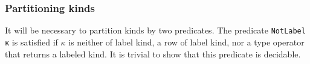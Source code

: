 \documentclass[authoryear, acmsmall, screen, review, nonacm]{acmart}
\begin{document}
\begin{code}%
\>[0]\AgdaSpace{}%
\AgdaSpace{}%
\AgdaSymbol{:}\AgdaSpace{}%
\AgdaSpace{}%
\AgdaSpace{}%
\AgdaSpace{}%
\AgdaSpace{}%
\AgdaSpace{}%
\<%
\\
\>[0][@{}l@{\AgdaIndent{0}}]%
\>[2]\AgdaSpace{}%
\AgdaSymbol{:}\AgdaSpace{}%
\AgdaSpace{}%
\AgdaSymbol{(}\AgdaSpace{}%
\AgdaOperator{\AgdaInductiveConstructor{,,}}\AgdaSpace{}%
\AgdaSymbol{)}\AgdaSpace{}%
\<%
\\
%
\>[2]\AgdaSpace{}%
\AgdaSymbol{:}\AgdaSpace{}%
\AgdaSpace{}%
\AgdaSpace{}%
\AgdaSpace{}%
\AgdaSpace{}%
\AgdaSpace{}%
\AgdaSymbol{(}\AgdaSpace{}%
\AgdaOperator{\AgdaInductiveConstructor{,,}}\AgdaSpace{}%
\AgdaSymbol{)}\AgdaSpace{}%
\<%
\end{code}

\subsubsection{Partitioning kinds} It will be necessary to partition kinds by two predicates. The predicate \verb!NotLabel κ! is satisfied if $\kappa$ is neither of label kind, a row of label kind, nor a type operator that returns a labeled kind. It is trivial to show that this predicate is decidable.
\end{document}

